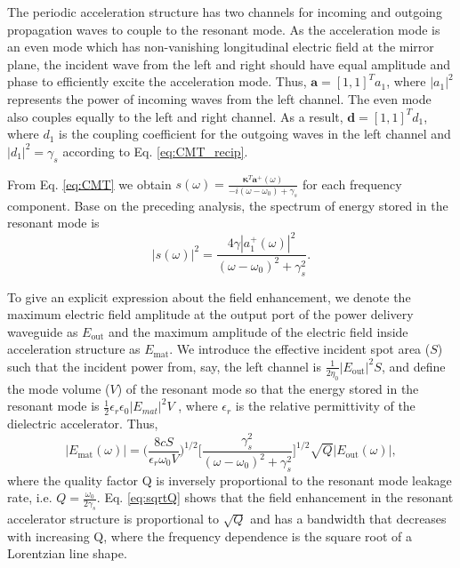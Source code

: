 The periodic acceleration structure has two channels for incoming and outgoing propagation waves to couple to the resonant mode. As the acceleration mode is an even mode which has non-vanishing longitudinal electric field at the mirror plane, the incident wave from the left and right should have equal amplitude and phase to efficiently excite the acceleration mode. Thus, $\boldsymbol{a} = [1, 1]^T a_1$, where $|a_1|^2$ represents the power of incoming waves from the left channel. The even mode also couples equally to the left and right channel. As a result, $\boldsymbol{d} = [1, 1]^T d_1$, where $d_1$ is the coupling coefficient for the outgoing waves in the left channel and $|d_1|^2 = \gamma_s$ according to Eq. \ref{eq:CMT_recip}.

From Eq. \ref{eq:CMT} we obtain $s(\omega) = 
\frac{\boldsymbol{\kappa}^T \boldsymbol{a}^+(\omega)}{-i(\omega - \omega_0) + \gamma_s}$ for each frequency component. Base on the preceding analysis, the spectrum of energy stored in the resonant mode is
\begin{equation}
|s(\omega)|^2 = \frac{ 4\gamma |a_1^+(\omega)|^2}{(\omega - \omega_0)^2 + \gamma_s^2}.
\end{equation}

To give an explicit expression about the field enhancement, we denote the maximum electric field amplitude at the output port of the power delivery waveguide as $E_\textrm{out}$ and the maximum amplitude of the electric field inside acceleration structure as $E_\textrm{mat}$. We introduce the effective incident spot area ($S$) such that the incident power from, say, the left channel is $\frac{1}{2\eta_0}|E_\textrm{out}|^2S$, and define the mode volume ($V$) of the resonant mode so that the energy stored in the resonant mode is $\frac{1}{2}\epsilon_r \epsilon_0 |E_{mat}|^2V$ \cite{jackson2007classical}, where $\epsilon_r$ is the relative permittivity of the dielectric accelerator. Thus,
\begin{equation}
\label{eq:sqrtQ}
|E_\textrm{mat}(\omega)| = \Big(\frac{8cS}{\epsilon_r \omega_0 V}\Big)^{1/2} \Big[ \frac{\gamma_s^2}{(\omega - \omega_0)^2 + \gamma_s^2} \Big]^{1/2} \sqrt{Q} |E_\textrm{out}(\omega)|,
\end{equation}
where the quality factor Q is inversely proportional to the resonant mode leakage rate, i.e. $Q = \frac{\omega_0}{2\gamma_s}$. Eq. \ref{eq:sqrtQ} shows that the field enhancement in the resonant accelerator structure is proportional to $\sqrt{Q}$ and has a bandwidth that decreases with increasing Q, where the frequency dependence is the square root of a Lorentzian line shape.

